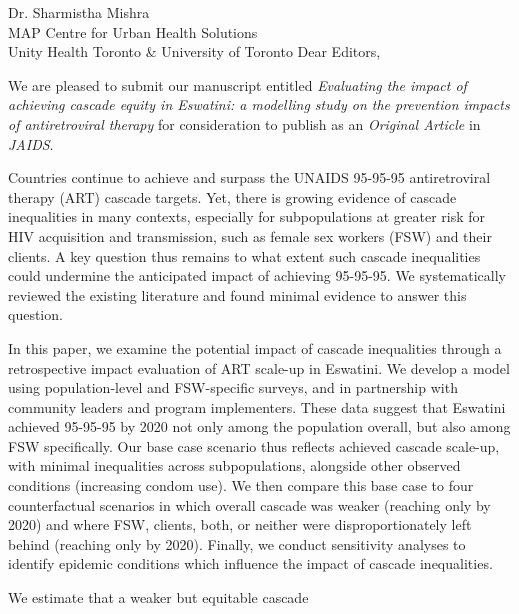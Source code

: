 \address{
  Dr. William A. Blattner\\
  Editor-in-Chief\\
  Journal of Acquired Immune Deficiency Syndromes
}{Dr. Sharmistha Mishra\\
  MAP Centre for Urban Health Solutions\\
  Unity Health Toronto \& University of Toronto}
Dear Editors,
\par
We are pleased to submit our manuscript entitled
\emph{Evaluating the impact of achieving cascade equity in Eswatini:
  a modelling study on the prevention impacts of antiretroviral therapy}
for consideration to publish as an \emph{Original Article} in \emph{JAIDS}.
\par
Countries continue to achieve and surpass
the UNAIDS 95-95-95 antiretroviral therapy (ART) cascade targets.
Yet, there is growing evidence of cascade inequalities in many contexts,
especially for subpopulations at greater risk for HIV acquisition and transmission,
such as female sex workers (FSW) and their clients.
A key question thus remains to what extent
such cascade inequalities could undermine the anticipated impact of achieving 95-95-95.
We systematically reviewed the existing literature
and found minimal evidence to answer this question.
\par
In this paper, we examine the potential impact of cascade inequalities
through a retrospective impact evaluation of ART scale-up in Eswatini.
We develop a model using population-level and FSW-specific surveys,
and in partnership with community leaders and program implementers.
These data suggest that Eswatini achieved 95-95-95 by 2020
not only among the population overall, but also among FSW specifically.
Our base case scenario thus reflects achieved cascade scale-up,
with minimal inequalities across subpopulations,
alongside other observed conditions (\eg increasing condom use).
We then compare this base case to four counterfactual scenarios in which
overall cascade was weaker (reaching only \casmd by 2020) and where
FSW, clients, both, or neither were disproportionately left behind
(reaching only \caslo by 2020).
Finally, we conduct sensitivity analyses to identify epidemic conditions
which influence the impact of cascade inequalities.
\par
We estimate that a weaker but equitable cascade
